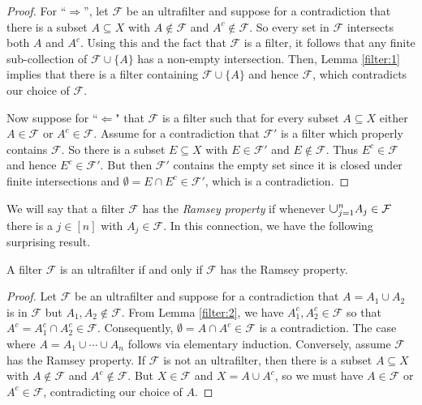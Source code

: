 \begin{proof}
For ``$\Rightarrow$'', let \( \mathcal{F}  \) be an ultrafilter and suppose for a contradiction that there is a subset \( A \subseteq X \) with \( A \notin \mathcal{F}  \) and \( A^{c} \notin \mathcal{F}  \). So every set in \( \mathcal{F}  \) intersects both \( A \) and \( A^{c}  \). Using this and the fact that \( \mathcal{F}  \) is a filter, it follows that any finite sub-collection of \( \mathcal{F} \cup \{ A \}  \) has a non-empty intersection. Then, Lemma \ref{filter:1} implies that there is a filter containing \( \mathcal{F} \cup \{ A \}  \) and hence \( \mathcal{F}  \), which contradicts our choice of \( \mathcal{F}  \).

Now suppose for ``$\Leftarrow$" that \( \mathcal{F}  \) is a filter such that for every subset \( A \subseteq X \) either \( A \in \mathcal{F}  \) or \( A^{c} \in \mathcal{F}  \). Assume for a contradiction that \( \mathcal{F}' \) is a filter which properly contains \( \mathcal{F}  \). So there is a subset \( E \subseteq X \) with \( E \in \mathcal{F} ' \) and \( E \notin \mathcal{F}  \). Thus \( E^{c} \in \mathcal{F}  \) and hence \( E^{c} \in \mathcal{F} ' \). But then \( \mathcal{F} ' \) contains the empty set since it is closed under finite intersections and \( \emptyset = E \cap E^{c} \in \mathcal{F} ' \), which is a contradiction.
\end{proof}
We will say that a filter \( \mathcal{F}  \) has the \emph{Ramsey property} if whenever \( \medcup_{j=1}^{n} A_{j}  \in \mathcal{F}  \) there is a \( j \in [n] \) with \( A_{j} \in \mathcal{F}  \). In this connection, we have the following surprising result.
\begin{lemma}
\label{filter:3}
A filter \( \mathcal{F}  \) is an ultrafilter if and only if \( \mathcal{F}  \) has the Ramsey property.
\end{lemma}
\begin{proof}
	Let \( \mathcal{F}  \) be an ultrafilter and suppose for a contradiction that \( A = A_1 \cup A_2 \) is in \( \mathcal{F}\) but \( A_1, A_2 \notin \mathcal{F}  \). From Lemma \ref{filter:2}, we have \( A_1^{c} , A_2^{c} \in \mathcal{F}  \) so that \( A^{c} = A_1^{c} \cap A_2^{c} \in \mathcal{F}  \). Consequently, \( \emptyset = A \cap A^{c} \in \mathcal{F}  \) is a contradiction. The case where \( A = A_1 \cup \cdots \cup A_{n}  \) follows via elementary induction. Conversely, assume \( \mathcal{F}  \) has the Ramsey property. If \( \mathcal{F}  \) is not an ultrafilter, then there is a subset \( A \subseteq X \) with \( A \notin \mathcal{F}  \) and \( A^{c} \notin \mathcal{F}  \). But \(X \in \mathcal{F}  \) and \( X = A \cup A^{c}  \), so we must have \( A \in \mathcal{F}  \) or \( A^{c} \in \mathcal{F}  \), contradicting our choice of \( A \).
\end{proof}

